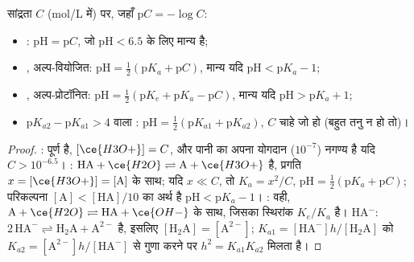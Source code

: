 \begin{proposition}\label{prop:b1:predominant-reaction:ph-formulas}
सांद्रता $C$ (\unit{mol/L} में) पर, जहाँ $\mathrm{p}C = -\log C$:
\begin{itemize}
  \item {}: $\mathrm{pH} = \mathrm{p}C$, जो
        $\mathrm{pH} < 6.5$ के लिए मान्य है;
  \item {}, अल्प-वियोजित: $\mathrm{pH} = \frac12(\mathrm{p}K_a
        + \mathrm{p}C)$, मान्य यदि $\mathrm{pH} < \mathrm{p}K_a - 1$;
  \item {}, अल्प-प्रोटॉनित: $\mathrm{pH} = \frac12(\mathrm{p}K_e +
        \mathrm{p}K_a - \mathrm{p}C)$, मान्य यदि $\mathrm{pH} > \mathrm{p}K_a +
        1$;
  \item $\mathrm{p}K_{a2} - \mathrm{p}K_{a1} > 4$ वाला :
        $\mathrm{pH} = \frac12(\mathrm{p}K_{a1} + \mathrm{p}K_{a2})$,
        $C$ चाहे जो हो (बहुत तनु न हो तो)।
\end{itemize}
\end{proposition}

\begin{proof}
:  पूर्ण है, $[\ce{H3O+}] = C$,
और पानी का अपना योगदान ($10^{-7}$) नगण्य है यदि $C > 10^{-6.5}$।
:  $\mathrm{HA} + \ce{H2O}
\rightleftharpoons \mathrm{A} + \ce{H3O+}$ है, प्रगति $x = [\ce{H3O+}]
= [\mathrm{A}]$ के साथ; यदि $x \ll C$, तो $K_a = x^2/C$, $\mathrm{pH} = \frac12(\mathrm{p}K_a
+ \mathrm{p}C)$; परिकल्पना $[\mathrm{A}] < [\mathrm{HA}]/10$ का अर्थ है
$\mathrm{pH} < \mathrm{p}K_a - 1$। : वही, $\mathrm{A} +
\ce{H2O} \rightleftharpoons \mathrm{HA} + \ce{OH-}$ के साथ, जिसका स्थिरांक $K_e/K_a$ है।
 HA$^-$:  $2\,\mathrm{HA}^- \rightleftharpoons
\mathrm{H_2A} + \mathrm{A}^{2-}$ है, इसलिए $[\mathrm{H_2A}] = [\mathrm{A}^{2-}]$;
$K_{a1} = [\mathrm{HA}^-]h/[\mathrm{H_2A}]$ को $K_{a2} =
[\mathrm{A}^{2-}]h/[\mathrm{HA}^-]$ से गुणा करने पर $h^2 = K_{a1}K_{a2}$ मिलता है।
\end{proof}

